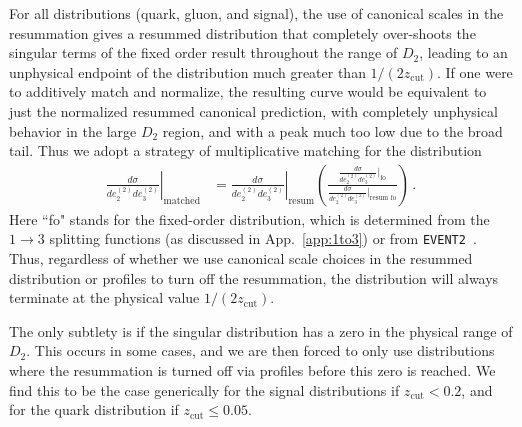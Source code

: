 \documentclass[a4paper,11pt]{article}
\newcommand{\ecf}[2]{e_{#1}^{(#2)}}
\DeclareRobustCommand{\App}[1]{App.~\ref{#1}}
\begin{document}
 For all distributions (quark, gluon, and signal), the use of canonical scales in the resummation gives a resummed distribution that completely over-shoots the singular terms of the fixed order result throughout the range of $D_2$, leading to an unphysical endpoint of the distribution much greater than $1/(2z_{\text{cut}})$. If one were to additively match and normalize, the resulting curve would be equivalent to just the normalized resummed canonical prediction, with completely unphysical behavior in the large $D_2$ region, and with a peak much too low due to the broad tail. Thus we adopt a strategy of multiplicative matching for the distribution
\begin{align}\label{eq:matching_to_fo}
\left.\frac{d\sigma}{d\ecf{2}{2}d\ecf{3}{2}}\right|_{\text{matched}}&=\left.\frac{d\sigma}{d\ecf{2}{2}d\ecf{3}{2}}\right|_{\text{resum}}\left(\frac{\frac{d\sigma}{d\ecf{2}{2}d\ecf{3}{2}}\Big|_{\text{fo}}}{\frac{d\sigma}{d\ecf{2}{2}d\ecf{3}{2}}\Big|_{\text{resum fo}}}\right)\,.
\end{align}
Here ``fo" stands for the fixed-order distribution, which is determined from the $1\rightarrow 3$ splitting functions (as discussed in \App{app:1to3}) or from {\tt EVENT2}~\cite{Catani:1996vz}. Thus, regardless of whether we use canonical scale choices in the resummed distribution or profiles to turn off the resummation, the distribution will always terminate at the physical value $1/(2z_{\text{cut}})$. 

The only subtlety is if the singular distribution has a zero in the physical range of $D_2$. This occurs in some cases, and we are then forced to only use distributions where the resummation is turned off via profiles before this zero is reached. We find this to be the case generically for the signal distributions if $z_{\text{cut}}<0.2$, and for the quark distribution if $z_{\text{cut}}\leq 0.05$. 
\end{document}
